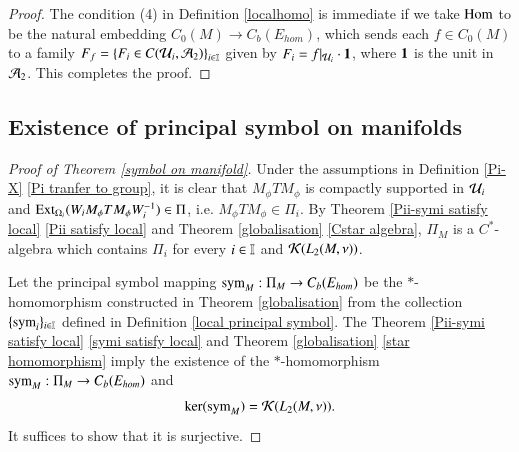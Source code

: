 \documentclass[leqno]{amsart}
\begin{document}
\begin{proof}
		The condition (4) in Definition \ref{localhomo} is immediate if we take ${\rm Hom}$ to be the natural embedding $C_{0}(M)\to C_{b}(E_{hom})$, which sends each $f\in C_{0}(M)$ to a family $F_{f}=\left\{ F_{i}\in C({\mathcal U}_{i},{\mathcal A}_{2}) \right\}_{i\in\mathbb I}$ given by $F_{i}=f|_{{\mathcal U}_{i}}\cdot\mathbf 1$, where $\mathbf 1$ is the unit in ${\mathcal A}_{2}$.
		This completes the proof. 
	\end{proof}
	
	
	
	
	
	
	\subsection{Existence of principal symbol on manifolds }
	
	
	\begin{proof}[Proof of Theorem \ref{symbol on manifold}]
		Under the assumptions in Definition \ref{Pi-X} \eqref{Pi tranfer to group}, it is clear that $M_{\phi}TM_{\phi}$ is compactly supported in ${\mathcal U}_{i}$ and ${\rm Ext}_{\Omega_{i}}(W_{i}M_{\phi}TM_{\phi}W_{i}^{-1})\in\Pi$, i.e. $M_{\phi}TM_{\phi}\in\Pi_{i}$. By Theorem \ref{Pii-symi satisfy local} \eqref{Pii satisfy local} and Theorem \ref{globalisation} \eqref{Cstar algebra}, $\Pi_{M}$ is a $C^{*}$-algebra which contains $\Pi_i$ for every $i\in\mathbb I$ and ${\mathcal K}(L_2(M,\nu))$. 
		
		Let the principal symbol mapping ${\rm sym}_{M}:\Pi_{M}\rightarrow C_{b}(E_{hom})$ be the $*$-homomorphism constructed in Theorem \ref{globalisation} from the collection $\{{\rm sym}_{i}\}_{i\in\mathbb I}$ defined in Definition \ref{local principal symbol}.
		The Theorem \ref{Pii-symi satisfy local} \eqref{symi satisfy local} and Theorem \ref{globalisation} \eqref{star homomorphism} imply the existence of the $*$-homomorphism ${\rm sym}_{M}:\Pi_{M}\to C_{b}(E_{hom})$ and $$\ker({\rm sym}_{M})={\mathcal K}(L_{2}(M,\nu)).$$
		It suffices to show that it is surjective.
		

\end{proof}
\end{document}
